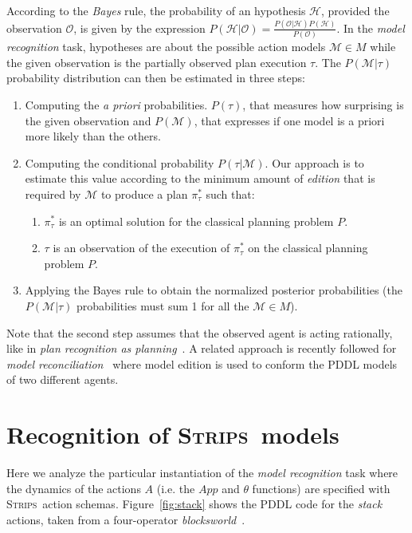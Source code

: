 \documentclass[letterpaper]{article} %
\newcommand{\strips}{\textsc{Strips}}     %
\begin{document}
According to the {\em Bayes} rule, the probability of an hypothesis $\mathcal{H}$, provided the observation $\mathcal{O}$, is given by the expression $P(\mathcal{H}|\mathcal{O})=\frac{P(\mathcal{O}|\mathcal{H})P(\mathcal{H})}{P(\mathcal{O})}$. In the {\em model recognition} task, hypotheses are about the possible action models $\mathcal{M}\in M$ while the given observation is the partially observed plan execution $\tau$. The $P(\mathcal{M}|\tau)$ probability distribution can then be estimated in three steps:
\begin{enumerate}
\item Computing the {\em a priori} probabilities. $P(\tau)$, that measures how surprising is the given observation and $P(\mathcal{M})$, that expresses if one model is a priori more likely than the others. 
\item Computing the conditional probability $P(\tau|\mathcal{M})$.  Our approach is to estimate this value according to the minimum amount of {\em edition} that is required by $\mathcal{M}$ to produce a plan $\pi^*_\tau$ such that:
\begin{enumerate}
\item $\pi^*_\tau$ is an optimal solution for the classical planning problem $P$. 
\item $\tau$ is an observation of the execution of $\pi^*_\tau$ on the classical planning problem $P$.
\end{enumerate}
\item Applying the Bayes rule to obtain the normalized posterior probabilities (the $P(\mathcal{M}|\tau)$ probabilities must sum 1 for all the $\mathcal{M}\in M$).
\end{enumerate}

Note that the second step assumes that the observed agent is acting rationally, like in {\em plan recognition as planning}~\cite{ramirez2012plan,ramirez2009plan}. A related approach is recently followed for {\em model reconciliation}~\cite{Kambhampati:mreconciliation:ijcai17} where model edition is used to conform the PDDL models of two different agents. 


\section{Recognition of \strips\ models}
\label{sec:asPlanning}
Here we analyze the particular instantiation of the {\em model recognition} task where the dynamics of the actions $A$ (i.e. the $App$ and $\theta$ functions) are specified with \strips\ action schemas. Figure~\ref{fig:stack} shows the PDDL code for the {\em stack} actions, taken from a four-operator {\em blocksworld}~\cite{slaney2001blocks}. 
\end{document}
